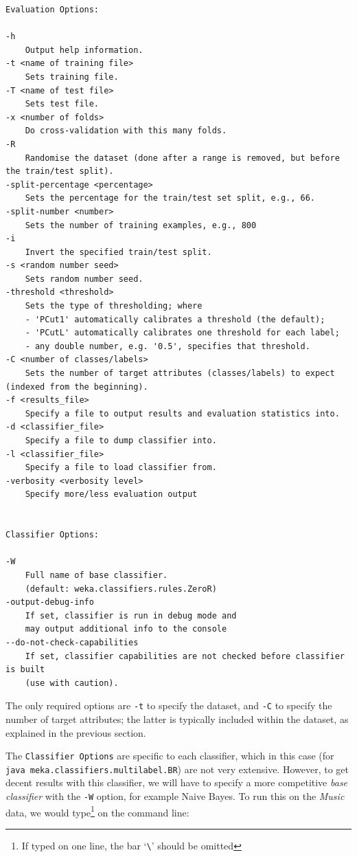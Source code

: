\documentclass[11pt]{article}
\begin{document}
{\small
\begin{lstlisting}
Evaluation Options:

-h
	Output help information.
-t <name of training file>
	Sets training file.
-T <name of test file>
	Sets test file.
-x <number of folds>
	Do cross-validation with this many folds.
-R
	Randomise the dataset (done after a range is removed, but before the train/test split).
-split-percentage <percentage>
	Sets the percentage for the train/test set split, e.g., 66.
-split-number <number>
	Sets the number of training examples, e.g., 800
-i
	Invert the specified train/test split.
-s <random number seed>
	Sets random number seed.
-threshold <threshold>
	Sets the type of thresholding; where
	- 'PCut1' automatically calibrates a threshold (the default);
	- 'PCutL' automatically calibrates one threshold for each label;
	- any double number, e.g. '0.5', specifies that threshold.
-C <number of classes/labels>
	Sets the number of target attributes (classes/labels) to expect (indexed from the beginning).
-f <results_file>
	Specify a file to output results and evaluation statistics into.
-d <classifier_file>
	Specify a file to dump classifier into.
-l <classifier_file>
	Specify a file to load classifier from.
-verbosity <verbosity level>
	Specify more/less evaluation output


Classifier Options:

-W
	Full name of base classifier.
	(default: weka.classifiers.rules.ZeroR)
-output-debug-info
	If set, classifier is run in debug mode and
	may output additional info to the console
--do-not-check-capabilities
	If set, classifier capabilities are not checked before classifier is built
	(use with caution).
\end{lstlisting}
}

The only required options are \texttt{-t} to specify the dataset, and \texttt{-C} to specify the number of target attributes; the latter is typically included within the dataset, as explained in the previous section.  

The \texttt{Classifier Options} are specific to each classifier, which in this case (for \texttt{java meka.classifiers.multilabel.BR}) are not very extensive. However, to get decent results with this classifier, we will have to specify a more competitive \emph{base classifier} with the \texttt{-W} option, for example Naive Bayes. To run this on the \textit{Music} data, we would type\footnote{If typed on one line, the bar `\texttt{\textbackslash}' should be omitted} on the command line:
\end{document}
